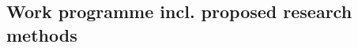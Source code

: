 \documentclass[enabledeprecatedfontcommands,cleardoublepage=empty,headsepline,twoside,11pt,DIV=15,BCOR=12mm,final]{scrartcl}
\newcommand{\nnew}[1]{{\textcolor{red}{#1}}}
\begin{document}
%




\subsection{Work programme incl. proposed research methods}
\label{sec:work-programme}

\end{document}
